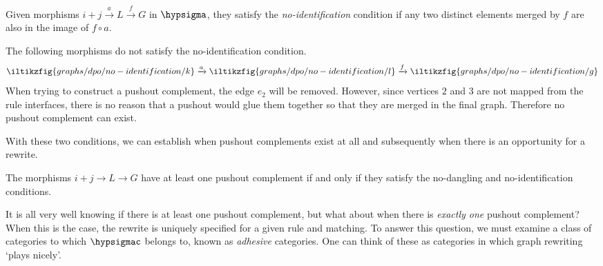 \begin{definition}
    Given morphisms \(i+j \xrightarrow{a} L \xrightarrow{f} G\) in
    \(\hypsigma\), they satisfy the \emph{no-identification} condition if any
    two distinct elements merged by \(f\) are also in the image of \(f \circ a\).
\end{definition}

\begin{example}
    The following morphisms do not satisfy the no-identification
    condition.
    \[
        \iltikzfig{graphs/dpo/no-identification/k}
        \xrightarrow{a}
        \iltikzfig{graphs/dpo/no-identification/l}
        \xrightarrow{f}
        \iltikzfig{graphs/dpo/no-identification/g}
    \]
    When trying to construct a pushout complement, the edge \(e_2\) will be
    removed.
    However, since vertices \(2\) and \(3\) are not mapped from the rule
    interfaces, there is no reason that a pushout would glue them together so
    that they are merged in the final graph.
    Therefore no pushout complement can exist.
    \begin{center}
    \end{center}
\end{example}

With these two conditions, we can establish when pushout complements exist at
all and subsequently when there is an opportunity for a rewrite.

\begin{proposition}
    \label{prop:pushout-complement}
    The morphisms \(i+j \to L \to G\) have at least one pushout
    complement if and only if they satisfy the no-dangling and no-identification
    conditions.
\end{proposition}

It is all very well knowing if there is at least one pushout complement, but
what about when there is \emph{exactly one} pushout complement?
When this is the case, the rewrite is uniquely specified for a given rule and
matching.
To answer this question, we must examine a class of categories to which
\(\hypsigmac\) belongs to, known as \emph{adhesive} categories.
One can think of these as categories in which graph rewriting `plays nicely'.

